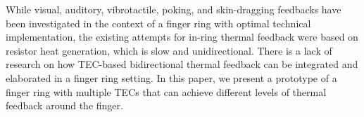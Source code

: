 \documentclass[preprint,12pt]{elsarticle}
\begin{document}
While visual, auditory, vibrotactile, poking, and skin-dragging feedbacks have been investigated in the context of a finger ring with optimal technical implementation, the existing attempts for in-ring thermal feedback were based on resistor heat generation, which is slow and unidirectional. There is a lack of research on how TEC-based bidirectional thermal feedback can be integrated and elaborated in a finger ring setting. In this paper, we present a prototype of a finger ring with multiple TECs that can achieve different levels of thermal feedback around the finger.



\end{document}
